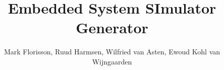 \documentclass{beamer}
\title[]{\Huge \textbf{Embedded System SImulator Generator}}
\author[]{
	Mark Florisson,
	Ruud Harmsen,
	Wilfried van Asten,
	Ewoud Kohl van Wijngaarden
  }
\institute{\small \vfill{Ontwerpproject (192199109) -- Faculty of Electrical Engineering, Mathematics and Computer Science -- University of Twente}}
\date{}
\begin{document}
  \begin{frame}{}

\vspace{-1cm}
\begin{columns}[t]
\begin{column}{.02\linewidth}\end{column}
\begin{column}{.97\linewidth}\end{column}
\begin{column}{.02\linewidth}\end{column}
\end{columns}

\linewidth

\begin{columns}[t]
\begin{column}{.02\linewidth}\end{column}
\begin{column}{.313\linewidth}\end{column}
\begin{column}{.01\linewidth}\end{column}
\begin{column}{.313\linewidth}\end{column}
\begin{column}{.01\linewidth}\end{column}
\begin{column}{.313\linewidth}\end{column}
\begin{column}{.02\linewidth}\end{column}
\end{columns}

{}\linewidth

\begin{columns}[t]
\begin{column}{.02\linewidth}\end{column}
\begin{column}{.97\linewidth}\end{column}
\begin{column}{.02\linewidth}\end{column}
\end{columns}


\end{frame}
\end{document}
